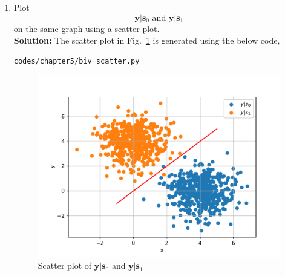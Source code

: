\documentclass[journal,10pt,twocolumn]{IEEEtran}
\newcommand\figref{Fig.~\ref}
\providecommand{\mbf}{\mathbf}
\newcommand{\solution}{\noindent \textbf{Solution: }}
\begin{document}
\begin{enumerate}
\item
\label{ch5_fsk}
Plot 
%
\begin{equation}
\mbf{y}|\mbf{s}_0 \text{ and } \mbf{y}|\mbf{s}_1
\end{equation}
%
on the same graph using a scatter plot.\\
\solution The scatter plot in \figref{fig:biv_scatter} is generated using the below code,
\begin{lstlisting}
codes/chapter5/biv_scatter.py
\end{lstlisting}
%
\begin{figure}[H]
\centering
\includegraphics[width=\columnwidth]{./figs/chapter5/biv_scatter.pdf}
\caption{Scatter plot of $\mbf{y}|\mbf{s}_0$ and $\mbf{y}|\mbf{s}_1$ }
\label{fig:biv_scatter}
\end{figure}


\end{enumerate}
\end{document}
